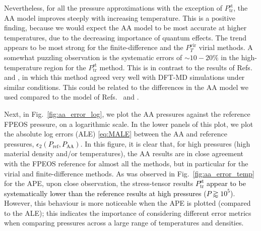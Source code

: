 \documentclass[%
 preprint,
 superscriptaddress,
 amsmath,amssymb,
longbibliography,
]{revtex4-2}
\newcommand{\change}[1]{\textcolor{black}{#1}}
\newcommand{\Pref}{P_\textrm{ref}}
\newcommand{\Psttr}{P^\textrm{st}_\textrm{tr}}
\newcommand{\Pvirt}{P^\textrm{vir}_T}
\begin{document}
Nevertheless, for all the pressure approximations with the exception of $\Psttr$, the AA model improves steeply with increasing temperature. This is a positive finding, because we would expect the AA model to be most accurate at higher temperatures, due to the decreasing importance of quantum effects. The trend appears to be most strong for the finite-difference and the $\Pvirt$ virial methods. A somewhat puzzling observation is the systematic errors of $\sim10-20\%$ in the high-temperature region for the $\Psttr$ method. This is in contrast to the results of Refs.~\cite{Pressure_warm_hot} and \cite{Carbon_ionization}, in which this method agreed very well with DFT-MD simulations under similar conditions. This could be related to the differences in the AA model we used compared to the model of Refs.~\cite{Pressure_warm_hot} and \cite{Carbon_ionization}.

Next, in Fig.~\ref{fig:aa_error_log}, we plot the AA pressures against the reference FPEOS pressure, on a logarithmic scale. In the lower panels of this plot, we plot the absolute log errors (ALE) \eqref{eq:MALE} between the AA and reference pressures, \change{$\epsilon_2(\Pref, P_\textrm{AA})$}. In this figure, it is clear that, for high pressures (high material density and/or temperatures), the AA results are in close agreement with the FPEOS reference for almost all the methods, but in particular for the virial and finite-difference methods. As was observed in Fig.~\ref{fig:aa_error_temp} for the APE, upon close observation, the stress-tensor results \change{$\Psttr$ appear to be systematically lower than the reference results at high pressures ($P\gtrapprox 10^5$)}. However, this behaviour is more noticeable when the APE is plotted (compared to the ALE); this indicates the importance of considering different error metrics when comparing pressures across a large range of temperatures and densities.
\end{document}
